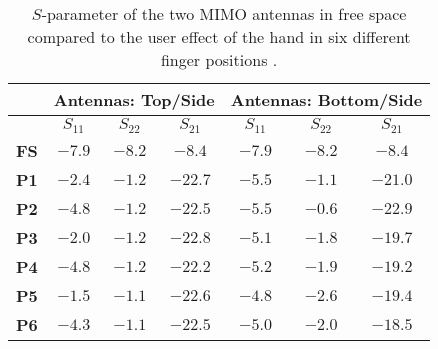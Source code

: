 \begin{table}[htbp]
  \centering
  \begin{tabular}{|c|c|c|c|c|c|c|}
    \hline
    & \multicolumn{3}{c|}{\textbf{Antennas: Top/Side}} & \multicolumn{3}{c|}{\textbf{Antennas: Bottom/Side}} \\ \hline
                  & $S_{11}$ & $S_{22}$ & $S_{21}$ & $S_{11}$ & $S_{22}$ & $S_{21}$             \\ \hline
    \textbf{FS}   & $-7.9$   & $-8.2$   & $-8.4 $  & $-7.9$   & $-8.2$   & $-8.4 $           \\ \hline
    \textbf{P1}   & $-2.4$   & $-1.2$   & $-22.7$  & $-5.5$   & $-1.1$   & $-21.0$           \\ \hline
    \textbf{P2}   & $-4.8$   & $-1.2$   & $-22.5$  & $-5.5$   & $-0.6$   & $-22.9$           \\ \hline
    \textbf{P3}   & $-2.0$   & $-1.2$   & $-22.8$  & $-5.1$   & $-1.8$   & $-19.7$           \\ \hline
    \textbf{P4}   & $-4.8$   & $-1.2$   & $-22.2$  & $-5.2$   & $-1.9$   & $-19.2$           \\ \hline
    \textbf{P5}   & $-1.5$   & $-1.1$   & $-22.6$  & $-4.8$   & $-2.6$   & $-19.4$           \\ \hline
    \textbf{P6}   & $-4.3$   & $-1.1$   & $-22.5$  & $-5.0$   & $-2.0$   & $-18.5$           \\ \hline
  \end{tabular}
  \caption{$S$-parameter of the two MIMO antennas in free space compared to the user effect of the hand in six different finger positions \cite{Samantha2014UserEff}.}
  \label{tab:usereff_s11}
\end{table}

